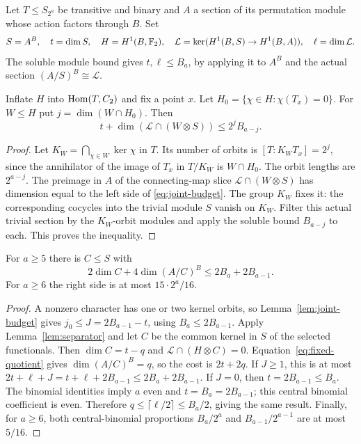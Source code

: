 Let $T\leq S_{2^a}$ be transitive and binary and $A$ a section of its
permutation module whose action factors through $B$. Set
\[
 S=A^B,\quad t=\dim S,\quad H=H^1(B,\mathbb F_2),\quad
 \mathcal L=\ker(H^1(B,S)\to H^1(B,A)),\quad\ell=\dim\mathcal L.
\]
The soluble module bound gives $t,\ell\leq B_a$, by applying it
to $A^B$ and the actual section $(A/S)^B\cong\mathcal L$.

\begin{lemma}\label{lem:joint-budget}
Inflate $H$ into $\operatorname{Hom}(T,C_2)$ and fix a point $x$. Let
$H_0=\{\chi\in H:\chi(T_x)=0\}$. For $W\leq H$ put
$j=\dim(W\cap H_0)$. Then
\begin{equation}\label{eq:joint-budget}
 t+\dim(\mathcal L\cap(W\otimes S))\leq2^jB_{a-j}.
\end{equation}
\end{lemma}
\begin{proof}
Let $K_W=\bigcap_{\chi\in W}\ker\chi$ in $T$. Its number of orbits
is $[T:K_WT_x]=2^j$, since the annihilator of the image of $T_x$ in
$T/K_W$ is $W\cap H_0$. The orbit lengths are $2^{a-j}$.
The preimage in $A$ of the connecting-map slice
$\mathcal L\cap(W\otimes S)$ has dimension equal to the left side
of \eqref{eq:joint-budget}. The group $K_W$ fixes it: the corresponding
cocycles into the trivial module $S$ vanish on $K_W$.
Filter this actual trivial section by the $K_W$-orbit modules and
apply the soluble bound $B_{a-j}$ to each. This proves the inequality.
\end{proof}

\begin{theorem}\label{thm:binary-large-capacity}
For $a\geq5$ there is $C\leq S$ with
\begin{equation}\label{eq:binary-capacity}
 2\dim C+4\dim(A/C)^B\leq2B_a+2B_{a-1}.
\end{equation}
For $a\geq6$ the right side is at most $15\cdot2^a/16$.
\end{theorem}
\begin{proof}
A nonzero character has one or two kernel orbits, so
Lemma~\ref{lem:joint-budget} gives
$j_0\leq J=2B_{a-1}-t$, using $B_a\leq2B_{a-1}$.
Apply Lemma~\ref{lem:separator} and let $C$ be the common kernel in
$S$ of the selected functionals. Then $\dim C=t-q$ and
$\mathcal L\cap(H\otimes C)=0$. Equation~\eqref{eq:fixed-quotient}
gives $\dim(A/C)^B=q$, so the cost is $2t+2q$.
If $J\geq1$, this is at most
$2t+\ell+J=t+\ell+2B_{a-1}\leq2B_a+2B_{a-1}$.
If $J=0$, then $t=2B_{a-1}\leq B_a$. The binomial identities imply
$a$ even and $t=B_a=2B_{a-1}$; this central binomial coefficient is
even. Therefore $q\leq\lceil\ell/2\rceil\leq B_a/2$, giving the
same result. Finally, for $a\geq6$, both central-binomial proportions
$B_a/2^a$ and $B_{a-1}/2^{a-1}$ are at most $5/16$.
\end{proof}

